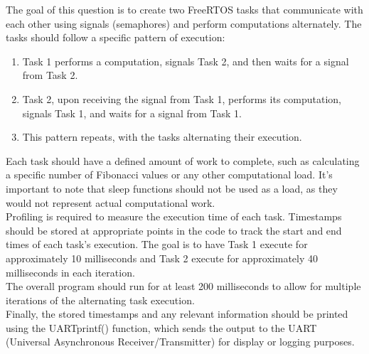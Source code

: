 \documentclass[a4paper,11pt]{article}%
\newenvironment{qanda}{\setlength{\parindent}{0pt}}{\bigskip}
\begin{document}
\begin{qanda}
	The goal of this question is to create two FreeRTOS tasks that communicate with each other using signals (semaphores) and perform computations alternately. The tasks should follow a specific pattern of execution:
\begin{enumerate}
	\item Task 1 performs a computation, signals Task 2, and then waits for a signal from Task 2.
	\item Task 2, upon receiving the signal from Task 1, performs its computation, signals Task 1, and waits for a signal from Task 1.
	\item This pattern repeats, with the tasks alternating their execution.
\end{enumerate}


Each task should have a defined amount of work to complete, such as calculating a specific number of Fibonacci values or any other computational load. It's important to note that sleep functions should not be used as a load, as they would not represent actual computational work.\\

Profiling is required to measure the execution time of each task. Timestamps should be stored at appropriate points in the code to track the start and end times of each task's execution. The goal is to have Task 1 execute for approximately 10 milliseconds and Task 2 execute for approximately 40 milliseconds in each iteration.\\

The overall program should run for at least 200 milliseconds to allow for multiple iterations of the alternating task execution.\\

Finally, the stored timestamps and any relevant information should be printed using the UARTprintf() function, which sends the output to the UART (Universal Asynchronous Receiver/Transmitter) for display or logging purposes.\\


\end{qanda}
\end{document}
